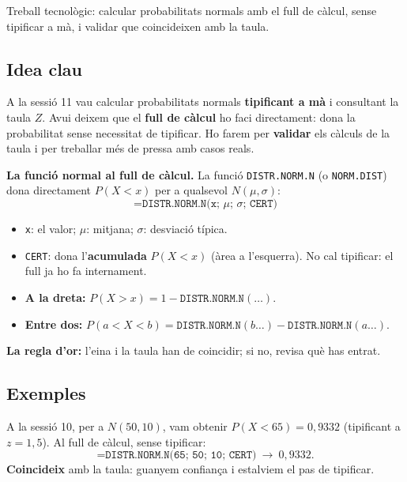%
{Treball tecnològic: calcular probabilitats normals amb el full de càlcul, sense tipificar a mà, i validar que coincideixen amb la taula.}

\subsection{Idea clau}

A la sessió 11 vau calcular probabilitats normals \textbf{tipificant a mà} i consultant la
taula $Z$. Avui deixem que el \textbf{full de càlcul} ho faci directament: dona la
probabilitat sense necessitat de tipificar. Ho farem per \textbf{validar} els càlculs de
la taula i per treballar més de pressa amb casos reals.

\begin{idea}
\textbf{La funció normal al full de càlcul.} La funció \texttt{DISTR.NORM.N} (o
\texttt{NORM.DIST}) dona directament $P(X<x)$ per a qualsevol $N(\mu,\sigma)$:
\[
\texttt{=DISTR.NORM.N(x;\ }\mu\texttt{;\ }\sigma\texttt{;\ CERT)}
\]
\begin{itemize}[leftmargin=1.4em, itemsep=2pt]
  \item \texttt{x}: el valor; $\mu$: mitjana; $\sigma$: desviació típica.
  \item \texttt{CERT}: dona l'\textbf{acumulada} $P(X<x)$ (àrea a l'esquerra). No cal
        tipificar: el full ja ho fa internament.
  \item \textbf{A la dreta:} $P(X>x)=1-\texttt{DISTR.NORM.N}(\dots)$.
  \item \textbf{Entre dos:} $P(a<X<b)=\texttt{DISTR.NORM.N}(b\dots)-\texttt{DISTR.NORM.N}(a\dots)$.
\end{itemize}
\textbf{La regla d'or:} l'eina i la taula han de coincidir; si no, revisa què has entrat.
\end{idea}

\subsection{Exemples}

\begin{exemple}
A la sessió 10, per a $N(50,10)$, vam obtenir $P(X<65)=0,9332$ (tipificant a $z=1,5$). Al
full de càlcul, sense tipificar:
\[
\texttt{=DISTR.NORM.N(65;\ 50;\ 10;\ CERT)}\ \to\ 0,9332.
\]
\textbf{Coincideix} amb la taula: guanyem confiança i estalviem el pas de tipificar.
\end{exemple}

